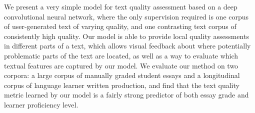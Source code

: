 We present a very simple model for text quality assessment based on a deep convolutional neural network, where the only supervision required is one corpus of user-generated text of varying quality, and one contrasting text corpus of consistently high quality. Our model is able to provide local quality assessments in different parts of a text, which allows visual feedback about where potentially problematic parts of the text are located, as well as a way to evaluate which textual features are captured by our model. We evaluate our method on two corpora: a large corpus of manually graded student essays and a longitudinal corpus of language learner written production, and find that the text quality metric learned by our model is a fairly strong predictor of both essay grade and learner proficiency level.
